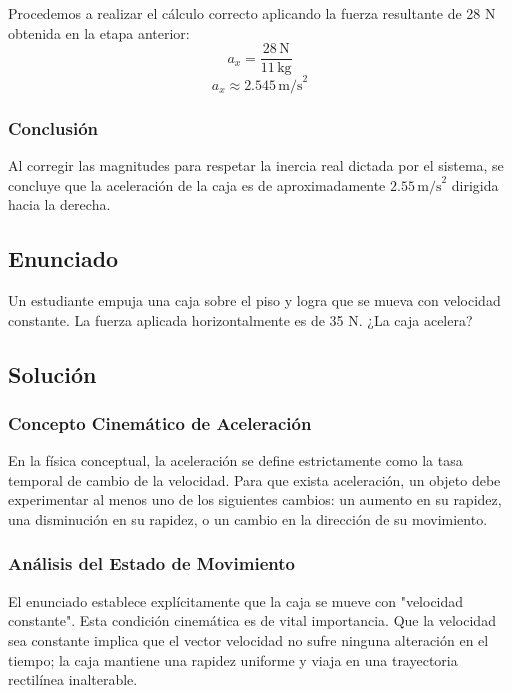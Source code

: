 \documentclass[12pt]{article}
\begin{document}
Procedemos a realizar el cálculo correcto aplicando la fuerza resultante de 28 N obtenida en la etapa anterior:
\begin{equation}
    a_x = \frac{28 \, \text{N}}{11 \, \text{kg}}
\end{equation}
\begin{equation}
    a_x \approx 2.545 \, \text{m/s}^2
\end{equation}

\subsubsection*{Conclusión}
Al corregir las magnitudes para respetar la inercia real dictada por el sistema, se concluye que la aceleración de la caja es de aproximadamente $2.55 \, \text{m/s}^2$ dirigida hacia la derecha.

\newpage

\subsection*{Enunciado}
Un estudiante empuja una caja sobre el piso y logra que se mueva con velocidad constante. La fuerza aplicada horizontalmente es de 35 N. ¿La caja acelera?

\subsection*{Solución}

\subsubsection*{Concepto Cinemático de Aceleración}
En la física conceptual, la aceleración se define estrictamente como la tasa temporal de cambio de la velocidad. Para que exista aceleración, un objeto debe experimentar al menos uno de los siguientes cambios: un aumento en su rapidez, una disminución en su rapidez, o un cambio en la dirección de su movimiento. 

\subsubsection*{Análisis del Estado de Movimiento}
El enunciado establece explícitamente que la caja se mueve con "velocidad constante". Esta condición cinemática es de vital importancia. Que la velocidad sea constante implica que el vector velocidad no sufre ninguna alteración en el tiempo; la caja mantiene una rapidez uniforme y viaja en una trayectoria rectilínea inalterable. 
\end{document}
